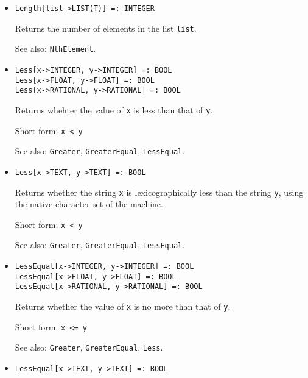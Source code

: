 \begin{itemize}
\item
\protect \large \begin{verbatim}
Length[list->LIST(T)] =: INTEGER
\end{verbatim}\normalsize

\bd
Returns the number of elements in the list \verb+list+.
\item
[See also:] {\tt NthElement}.
\ed

\item
\protect \large \begin{verbatim}
Less[x->INTEGER, y->INTEGER] =: BOOL
Less[x->FLOAT, y->FLOAT] =: BOOL
Less[x->RATIONAL, y->RATIONAL] =: BOOL
\end{verbatim}\normalsize

\bd
Returns whehter the value of \verb+x+ is less than that of
\verb+y+.
\item
[Short form:] \verb+x < y+
\item
[See also:] {\tt Greater}, {\tt GreaterEqual}, {\tt LessEqual}.
\ed

\item
\protect \large \begin{verbatim}
Less[x->TEXT, y->TEXT] =: BOOL
\end{verbatim}\normalsize

\bd
Returns whether the string \verb+x+ is lexicographically less than
the string \verb+y+, using the native character set of the machine.
\item
[Short form:] \verb+x < y+
\item
[See also:] {\tt Greater}, {\tt GreaterEqual}, {\tt LessEqual}.
\ed

\item
\protect \large \begin{verbatim}
LessEqual[x->INTEGER, y->INTEGER] =: BOOL
LessEqual[x->FLOAT, y->FLOAT] =: BOOL
LessEqual[x->RATIONAL, y->RATIONAL] =: BOOL
\end{verbatim}\normalsize

\bd
Returns whether the value of \verb+x+ is no more than that
of \verb+y+.
\item
[Short form:] \verb+x <= y+
\item
[See also:] {\tt Greater}, {\tt GreaterEqual}, {\tt Less}.
\ed

\item
\protect \large \begin{verbatim}
LessEqual[x->TEXT, y->TEXT] =: BOOL
\end{verbatim}\normalsize


\end{itemize}
